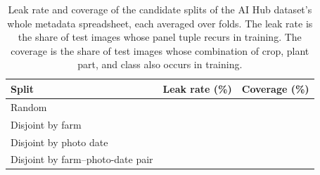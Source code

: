 \documentclass[11pt]{article}
\begin{document}
\begin{table}[H]
\centering
\scriptsize
\caption{Leak rates (\%) of the two sets of identifiers in the CDD study's
repository. The first three columns give the share of test images whose environment
series occurs in training, in training images of the test image's own class, and in
training and validation together. The last two give the share of test identifiers
that appear verbatim in training, and in training and validation together. Series
are matched by their values with the column of reading times dropped, or by their raw
files.}
\label{tab:leak}

\end{table}

\begin{table}[H]
\centering
\footnotesize
\caption{Leak rate and coverage of the \candidateSplits{} candidate splits of the AI
Hub dataset's whole metadata spreadsheet, each averaged over \candidateFolds{} folds.
The leak rate is the share of test images whose panel tuple recurs in training. The
coverage is the share of test images whose combination of crop, plant part, and class
also occurs in training.}
\label{tab:candidates}
\begin{tabular}{lcc}
\toprule
Split & Leak rate (\%) & Coverage (\%) \\
\midrule
Random & \candidateRandomLeak{} & \candidateRandomCoverage{} \\
Disjoint by farm & \candidateFarmLeak{} & \candidateFarmCoverage{} \\
Disjoint by photo date & \candidateDateLeak{} & \candidateDateCoverage{} \\
Disjoint by farm--photo-date pair & \candidateSessionLeak{} & \candidateSessionCoverage{} \\
\bottomrule
\end{tabular}
\end{table}
\end{document}
